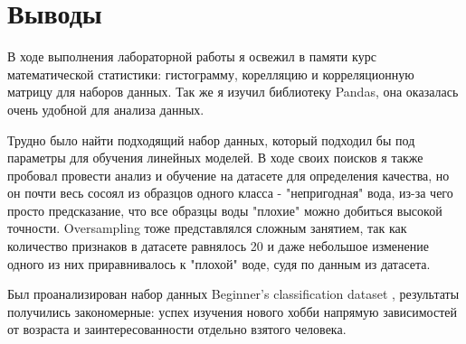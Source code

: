 \section{Выводы}
В ходе выполнения лабораторной работы я освежил в памяти курс математической статистики: гистограмму, корелляцию и корреляционную матрицу 
для наборов данных. Так же я изучил библиотеку Pandas, она оказалась очень удобной для анализа данных.

Трудно было найти подходящий набор данных, который подходил бы под параметры для обучения линейных моделей. В ходе своих поисков я также пробовал
провести анализ и обучение на датасете для определения качества, но он почти весь сосоял из образцов одного класса - "непригодная" вода, из-за чего
просто предсказание, что все образцы воды "плохие" можно добиться высокой точности. Oversampling тоже представлялся сложным занятием, так как количество
признаков в датасете равнялось 20 и даже небольшое изменение одного из них приравнивалось к "плохой" воде, судя по данным из датасета.

Был проанализирован набор данных Beginner's classification dataset \cite{kaggle}, результаты получились закономерные: успех изучения нового хобби напрямую зависимостей
от возраста и заинтересованности отдельно взятого человека.
\pagebreak
